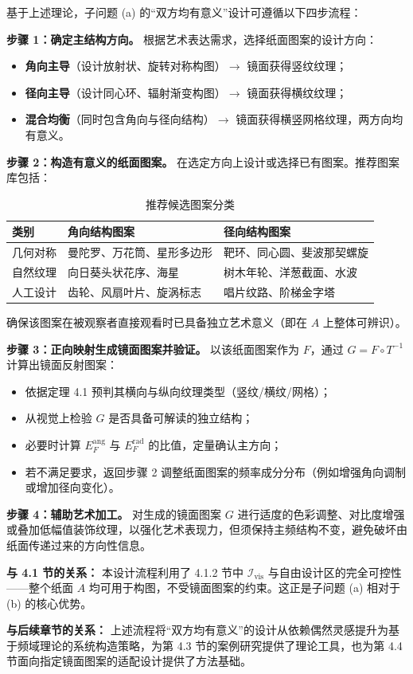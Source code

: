 \documentclass[12pt,a4paper]{ctexart}
\begin{document}
基于上述理论，子问题 (a) 的``双方均有意义''设计可遵循以下四步流程：

\textbf{步骤 1：确定主结构方向。} 根据艺术表达需求，选择纸面图案的设计方向：
\begin{itemize}
    \item \textbf{角向主导}（设计放射状、旋转对称构图）$\rightarrow$ 镜面获得竖纹纹理；
    \item \textbf{径向主导}（设计同心环、辐射渐变构图）$\rightarrow$ 镜面获得横纹纹理；
    \item \textbf{混合均衡}（同时包含角向与径向结构）$\rightarrow$ 镜面获得横竖网格纹理，两方向均有意义。
\end{itemize}

\textbf{步骤 2：构造有意义的纸面图案。} 在选定方向上设计或选择已有图案。推荐图案库包括：

\begin{table}[htbp]
\centering
\caption{推荐候选图案分类}
\label{tab:pattern-lib}
\begin{tabular}{lll}
\toprule
类别 & 角向结构图案 & 径向结构图案 \\
\midrule
几何对称 & 曼陀罗、万花筒、星形多边形 & 靶环、同心圆、斐波那契螺旋 \\
自然纹理 & 向日葵头状花序、海星 & 树木年轮、洋葱截面、水波 \\
人工设计 & 齿轮、风扇叶片、旋涡标志 & 唱片纹路、阶梯金字塔 \\
\bottomrule
\end{tabular}
\end{table}

确保该图案在被观察者直接观看时已具备独立艺术意义（即在 $A$ 上整体可辨识）。

\textbf{步骤 3：正向映射生成镜面图案并验证。} 以该纸面图案作为 $F$，通过 $G = F\circ T^{-1}$ 计算出镜面反射图案：
\begin{itemize}
    \item 依据定理 4.1 预判其横向与纵向纹理类型（竖纹/横纹/网格）；
    \item 从视觉上检验 $G$ 是否具备可解读的独立结构；
    \item 必要时计算 $E_F^{\mathrm{ang}}$ 与 $E_F^{\mathrm{rad}}$ 的比值，定量确认主方向；
    \item 若不满足要求，返回步骤 2 调整纸面图案的频率成分分布（例如增强角向调制或增加径向变化）。
\end{itemize}

\textbf{步骤 4：辅助艺术加工。} 对生成的镜面图案 $G$ 进行适度的色彩调整、对比度增强或叠加低幅值装饰纹理，以强化艺术表现力，但须保持主频结构不变，避免破坏由纸面传递过来的方向性信息。

\textbf{与 4.1 节的关系：} 本设计流程利用了 4.1.2 节中 $\mathcal{I}_{\mathrm{vis}}$ 与自由设计区的完全可控性——整个纸面 $A$ 均可用于构图，不受镜面图案的约束。这正是子问题 (a) 相对于 (b) 的核心优势。

\textbf{与后续章节的关系：} 上述流程将``双方均有意义''的设计从依赖偶然灵感提升为基于频域理论的系统构造策略，为第 4.3 节的案例研究提供了理论工具，也为第 4.4 节面向指定镜面图案的适配设计提供了方法基础。
\end{document}
